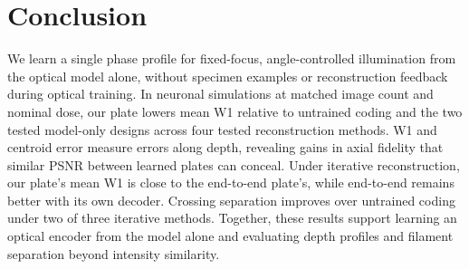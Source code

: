 \section{Conclusion}
\label{sec:conclusion}

We learn a single phase profile for fixed-focus, angle-controlled illumination from the optical model alone, without specimen examples or reconstruction feedback during optical training. In neuronal simulations at matched image count and nominal dose, our plate lowers mean W1 relative to untrained coding and the two tested model-only designs across four tested reconstruction methods. W1 and centroid error measure errors along depth, revealing gains in axial fidelity that similar PSNR between learned plates can conceal. Under iterative reconstruction, our plate's mean W1 is close to the end-to-end plate's, while end-to-end remains better with its own decoder. Crossing separation improves over untrained coding under two of three iterative methods. Together, these results support learning an optical encoder from the model alone and evaluating depth profiles and filament separation beyond intensity similarity.
